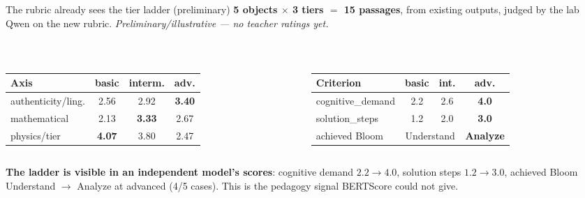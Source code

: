 \documentclass[aspectratio=169,10pt]{beamer}
\begin{document}
\begin{frame}{The rubric already sees the tier ladder (preliminary)}
\scriptsize
\textbf{5 objects $\times$ 3 tiers $=$ 15 passages}, from existing outputs, judged by the lab Qwen
on the new rubric. \emph{Preliminary/illustrative --- no teacher ratings yet.}
\vspace{0.2em}
\renewcommand{\arraystretch}{1.2}
\begin{columns}[T]
\begin{column}{0.5\textwidth}
\\[2pt]
\begin{tabular}{@{}lccc@{}}
\toprule
\textbf{Axis} & \color{cBasic}basic & \color{cInter}interm. & \color{cAdv}adv. \\
\midrule
authenticity/ling. & 2.56 & 2.92 & \textbf{3.40} \\
mathematical & 2.13 & \textbf{3.33} & 2.67 \\
physics/tier & \textbf{4.07} & 3.80 & 2.47 \\
\bottomrule
\end{tabular}
\end{column}
\begin{column}{0.5\textwidth}
\\[2pt]
\begin{tabular}{@{}lccc@{}}
\toprule
\textbf{Criterion} & \color{cBasic}basic & \color{cInter}int. & \color{cAdv}adv. \\
\midrule
cognitive\_demand & 2.2 & 2.6 & \textbf{4.0} \\
solution\_steps & 1.2 & 2.0 & \textbf{3.0} \\
achieved Bloom & \multicolumn{2}{c}{Understand} & \textbf{Analyze} \\
\bottomrule
\end{tabular}
\end{column}
\end{columns}
\vspace{0.5em}
\begin{tcolorbox}[colback=cApp!6,colframe=cApp,boxsep=2pt,left=5pt,right=5pt]
\scriptsize \textbf{\color{cApp}The ladder is visible in an independent model's scores}: cognitive
demand $2.2\to4.0$, solution steps $1.2\to3.0$, achieved Bloom Understand $\to$ Analyze at advanced
(4/5 cases). This is the pedagogy signal BERTScore could not give.
\end{tcolorbox}
\end{frame}
\end{document}
